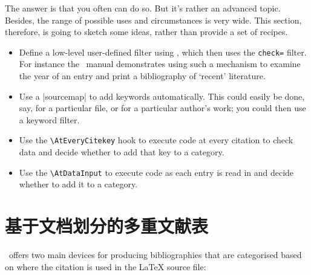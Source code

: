 The answer is that you often can do so. But it's rather an advanced
topic. Besides, the range of possible uses and circumstances is very
wide. This section, therefore, is going to sketch some ideas, rather
than provide a set of recipes.

\begin{itemize}
\item Define a low-level user-defined filter using
  , which then uses the
  \texttt{check=} filter. For instance the \biblatex\
  manual demonstrates using such a mechanism to
  examine the year of an entry and print a bibliography of `recent'
  literature.
\item Use a |sourcemap| to add keywords automatically. This could easily be done, say,
  for a particular file, or for a particular author's work; you could
  then use a keyword filter.
\item Use the
  \texttt{\textbackslash{}AtEveryCitekey} hook to execute code at
  every citation to check data and decide whether to add that key to a
  category.\csindex{AtEveryCitekey}
\item Use the \texttt{\textbackslash{}AtDataInput}
  to execute code as each entry is read in and decide whether to add
  it to a category.
\end{itemize}

\section{基于文档划分的多重文献表}

\biblatex\ offers two main devices for producing bibliographies that are
categorised based on where the citation is used in the LaTeX source
file:


